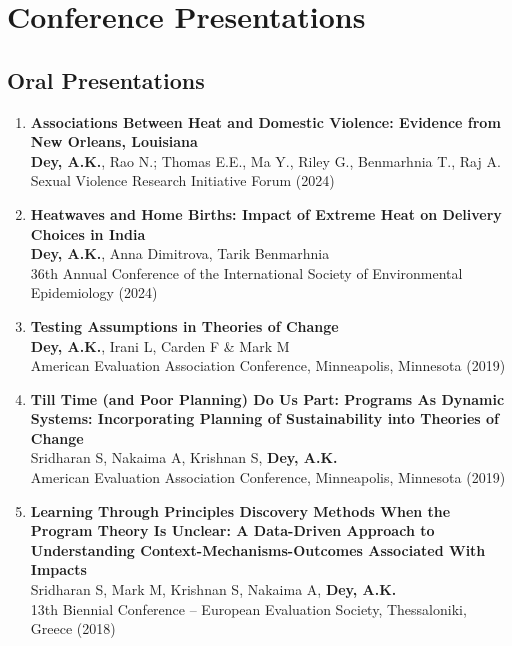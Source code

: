 \documentclass[13pt,letterpaper]{article}
\begin{document}
\section*{Conference Presentations}
\label{sec:org952072c}

\subsection*{Oral Presentations}
\label{sec:org645e1a6}

\begin{enumerate}
\item \textbf{Associations Between Heat and Domestic Violence: Evidence from New Orleans, Louisiana}\\
\textbf{Dey, A.K.}, Rao N.; Thomas E.E., Ma Y., Riley G., Benmarhnia T., Raj A.\\
Sexual Violence Research Initiative Forum (2024) 

\item \textbf{Heatwaves and Home Births: Impact of Extreme Heat on Delivery Choices in India}\\
\textbf{Dey, A.K.}, Anna Dimitrova, Tarik Benmarhnia\\
36th Annual Conference of the International Society of Environmental Epidemiology (2024) 

\item \textbf{Testing Assumptions in Theories of Change}\\
\textbf{Dey, A.K.}, Irani L, Carden F \& Mark M\\
American Evaluation Association Conference, Minneapolis, Minnesota (2019) 

\item \textbf{Till Time (and Poor Planning) Do Us Part: Programs As Dynamic Systems: Incorporating Planning of Sustainability into Theories of Change}\\
Sridharan S, Nakaima A, Krishnan S, \textbf{Dey, A.K.}\\
American Evaluation Association Conference, Minneapolis, Minnesota (2019) 

\item \textbf{Learning Through Principles Discovery Methods When the Program Theory Is Unclear: A Data-Driven Approach to Understanding Context-Mechanisms-Outcomes Associated With Impacts}\\
Sridharan S, Mark M, Krishnan S, Nakaima A, \textbf{Dey, A.K.}\\
13th Biennial Conference – European Evaluation Society, Thessaloniki, Greece (2018) 


\end{enumerate}
\end{document}
